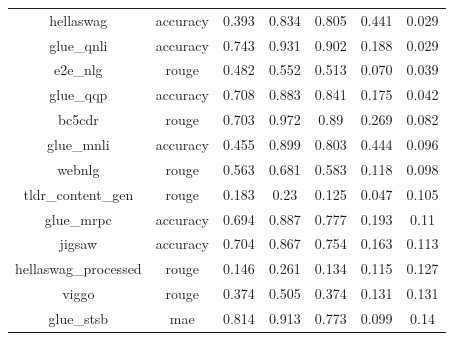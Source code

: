\begin{table}[ht]
{\begin{tabular}{ccccccc}
hellaswag            & accuracy             & 0.393                & 0.834                & 0.805                & 0.441                 & 0.029                    \\
glue\_qnli           & accuracy             & 0.743                & 0.931                & 0.902                & 0.188                 & 0.029                    \\
e2e\_nlg             & rouge                & 0.482                & 0.552                & 0.513                & 0.070                 & 0.039                    \\
glue\_qqp            & accuracy             & 0.708                & 0.883                & 0.841                & 0.175                 & 0.042                    \\
bc5cdr               & rouge                & 0.703                & 0.972                & 0.89                 & 0.269                 & 0.082                    \\
glue\_mnli           & accuracy             & 0.455                & 0.899                & 0.803                & 0.444                 & 0.096                    \\
webnlg               & rouge                & 0.563                & 0.681                & 0.583                & 0.118                 & 0.098                    \\
tldr\_content\_gen   & rouge                & 0.183                & 0.23                 & 0.125                & 0.047                 & 0.105                    \\
glue\_mrpc           & accuracy             & 0.694                & 0.887                & 0.777                & 0.193                 & 0.11                     \\
jigsaw               & accuracy             & 0.704                & 0.867                & 0.754                & 0.163                 & 0.113                    \\
hellaswag\_processed & rouge                & 0.146                & 0.261                & 0.134                & 0.115                 & 0.127                    \\
viggo                & rouge                & 0.374                & 0.505                & 0.374                & 0.131                 & 0.131                    \\
glue\_stsb           & mae                  & 0.814                & 0.913                & 0.773                & 0.099                 & 0.14                     \\

\end{tabular}}
\end{table}
